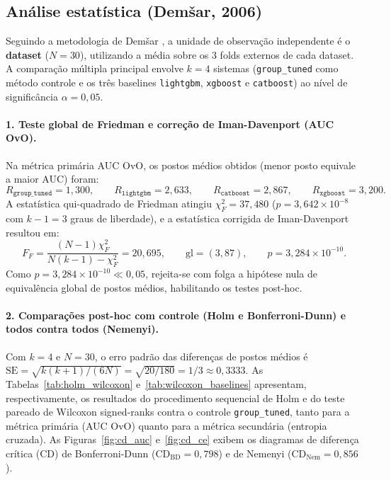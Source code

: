 \documentclass[11pt,a4paper]{article}
\begin{document}
\subsection{Análise estatística (Demšar, 2006)}
\label{sec:demsar}

Seguindo a metodologia de Demšar \cite{demsar2006statistical}, a unidade de observação independente é o \textbf{dataset} ($N = 30$), utilizando a média sobre os 3 folds externos de cada dataset. A comparação múltipla principal envolve $k = 4$ sistemas (\texttt{group\_tuned} como método controle e os três baselines \texttt{lightgbm}, \texttt{xgboost} e \texttt{catboost}) ao nível de significância $\alpha = 0{,}05$.

\paragraph{1. Teste global de Friedman e correção de Iman-Davenport (AUC OvO).}
Na métrica primária AUC OvO, os postos médios obtidos (menor posto equivale a maior AUC) foram:
\begin{equation}
    R_{\texttt{group\_tuned}} = 1{,}300, \qquad
    R_{\texttt{lightgbm}} = 2{,}633, \qquad
    R_{\texttt{catboost}} = 2{,}867, \qquad
    R_{\texttt{xgboost}} = 3{,}200.
\end{equation}
A estatística qui-quadrado de Friedman atingiu $\chi^2_F = 37{,}480$ ($p = 3{,}642 \times 10^{-8}$ com $k - 1 = 3$ graus de liberdade), e a estatística corrigida de Iman-Davenport resultou em:
\begin{equation}
    F_F = \frac{(N - 1)\chi^2_F}{N(k - 1) - \chi^2_F} = 20{,}695, \qquad \text{gl} = (3, 87), \qquad p = 3{,}284 \times 10^{-10}.
\end{equation}
Como $p = 3{,}284 \times 10^{-10} \ll 0{,}05$, rejeita-se com folga a hipótese nula de equivalência global de postos médios, habilitando os testes post-hoc.

\paragraph{2. Comparações post-hoc com controle (Holm e Bonferroni-Dunn) e todos contra todos (Nemenyi).}
Com $k = 4$ e $N = 30$, o erro padrão das diferenças de postos médios é $\mathrm{SE} = \sqrt{k(k+1)/(6N)} = \sqrt{20/180} = 1/3 \approx 0{,}3333$. As Tabelas~\ref{tab:holm_wilcoxon} e~\ref{tab:wilcoxon_baselines} apresentam, respectivamente, os resultados do procedimento sequencial de Holm e do teste pareado de Wilcoxon signed-ranks contra o controle \texttt{group\_tuned}, tanto para a métrica primária (AUC OvO) quanto para a métrica secundária (entropia cruzada). As Figuras~\ref{fig:cd_auc} e~\ref{fig:cd_ce} exibem os diagramas de diferença crítica (CD) de Bonferroni-Dunn ($\mathrm{CD}_{\mathrm{BD}} = 0{,}798$) e de Nemenyi ($\mathrm{CD}_{\mathrm{Nem}} = 0{,}856$).
\end{document}
